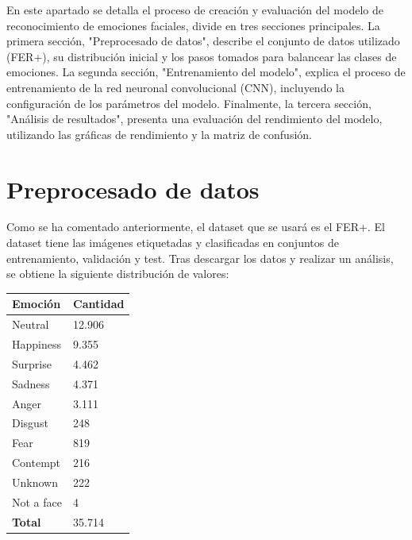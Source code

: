 \documentclass[12pt]{report} %
\begin{document}
En este apartado se detalla el proceso de creación y evaluación del modelo de reconocimiento de emociones faciales, divide en tres secciones principales. La primera sección, "Preprocesado de datos", describe el conjunto de datos utilizado (FER+), su distribución inicial y los pasos tomados para balancear las clases de emociones. La segunda sección, "Entrenamiento del modelo", explica el proceso de entrenamiento de la red neuronal convolucional (CNN), incluyendo la configuración de los parámetros del modelo. Finalmente, la tercera sección, "Análisis de resultados", presenta una evaluación del rendimiento del modelo, utilizando las gráficas de rendimiento y la matriz de confusión.

\section{Preprocesado de datos}

Como se ha comentado anteriormente, el dataset que se usará es el FER+. El dataset tiene las imágenes etiquetadas y clasificadas en conjuntos de entrenamiento, validación y test. Tras descargar los datos y realizar un análisis, se obtiene la siguiente distribución de valores:

\begin{table}[H]
	{
	  \begin{tabular}{|P{9cm}|P{4cm}|}
		\hline
		{\textbf{Emoción}} & {\textbf{Cantidad}} \\
		\hline
		Neutral & 12.906 \\
		\hline
		Happiness & 9.355 \\
		\hline
		Surprise & 4.462 \\
		\hline
		Sadness & 4.371 \\
		\hline
		Anger & 3.111 \\
		\hline
		Disgust & 248 \\
		\hline
		Fear & 819 \\
		\hline
		Contempt & 216 \\
		\hline
		Unknown & 222 \\
		\hline
		Not a face & 4 \\
		\hline
		{\textbf{Total}} & 35.714 \\
		\hline
	  \end{tabular}
	}
\end{table}
\end{document}
